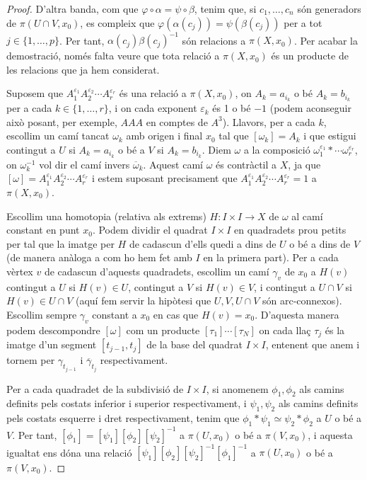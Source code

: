 \documentclass[../main.tex]{subfiles}
\begin{document}
\begin{proof}
D'altra banda, com que $\varphi\circ\alpha = \psi\circ\beta$, tenim que, si $c_1,\ldots,c_n$ són generadors de $\pi(U\cap V,x_0)$, es compleix que $\varphi(\alpha(c_j)) = \psi(\beta(c_j))$ per a tot $j\in\{1,\ldots,p\}$. Per tant, $\alpha(c_j)\beta(c_j)^{-1}$ són relacions a $\pi(X,x_0)$. Per acabar la demostració, només falta veure que tota relació a $\pi(X,x_0)$ és un producte de les relacions que ja hem considerat.

Suposem que $A_1^{\varepsilon_1}A_2^{\varepsilon_2}\cdots A_r^{\varepsilon_r}$ és una relació a $\pi(X,x_0)$, on $A_k = a_{i_k}$ o bé $A_k = b_{i_k}$ per a cada $k\in\{1,\ldots,r\}$, i on cada exponent $\varepsilon_k$ és 1 o bé $-1$ (podem aconseguir això posant, per exemple, $AAA$ en comptes de $A^3$). Llavors, per a cada $k$, escollim un camí tancat $\omega_k$ amb origen i final $x_0$ tal que $[\omega_k] = A_k$ i que estigui contingut a $U$ si $A_k = a_{i_k}$ o bé a $V$ si $A_k = b_{i_k}$. Diem $\omega$ a la composició $\omega_1^{\varepsilon_1}*\cdots\omega_r^{\varepsilon_r}$, on $\omega_k^{-1}$ vol dir el camí invers $\overline{\omega}_k$. Aquest camí $\omega$ és contràctil a $X$, ja que $[\omega] = A_1^{\varepsilon_1}A_2^{\varepsilon_2}\cdots A_r^{\varepsilon_r}$ i estem suposant precisament que $A_1^{\varepsilon_1}A_2^{\varepsilon_2}\cdots A_r^{\varepsilon_r} = 1$ a $\pi(X,x_0)$.

Escollim una homotopia (relativa als extrems) $H:I\times I\rightarrow X$ de $\omega$ al camí constant en punt $x_0$. Podem dividir el quadrat $I\times I$ en quadradets prou petits per tal que la imatge per $H$ de cadascun d'ells quedi a dins de $U$ o bé a dins de $V$ (de manera anàloga a com ho hem fet amb $I$ en la primera part). Per a cada vèrtex $v$ de cadascun d'aquests quadradets, escollim un camí $\gamma_v$ de $x_0$ a $H(v)$ contingut a $U$ si $H(v)\in U$, contingut a $V$ si $H(v)\in V$, i contingut a $U\cap V$ si $H(v)\in U\cap V$ (aquí fem servir la hipòtesi que $U,V,U\cap V$ són arc-connexos). Escollim sempre $\gamma_v$ constant a $x_0$ en cas que $H(v) = x_0$. D'aquesta manera podem descompondre $[\omega]$ com un producte $[\tau_1]\cdots[\tau_N]$ on cada llaç $\tau_j$ és la imatge d'un segment $[t_{j-1},t_j]$ de la base del quadrat $I\times I$, entenent que anem i tornem per $\gamma_{t_{j-1}}$ i $\overline{\gamma}_{t_j}$ respectivament.

Per a cada quadradet de la subdivisió de $I\times I$, si anomenem $\phi_1,\phi_2$ als camins definits pels costats inferior i superior respectivament, i $\psi_1,\psi_2$ als camins definits pels costats esquerre i dret respectivament, tenim que $\phi_1*\psi_1\simeq \psi_2*\phi_2$ a $U$ o bé a $V$. Per tant, $[\phi_1]=[\psi_1][\phi_2][\psi_2]^{-1}$ a $\pi(U,x_0)$ o bé a $\pi(V,x_0)$, i aquesta igualtat ens dóna una relació $[\psi_1][\phi_2][\psi_2]^{-1}[\phi_1]^{-1}$ a $\pi(U,x_0)$ o bé a $\pi(V,x_0)$.


\end{proof}
\end{document}
